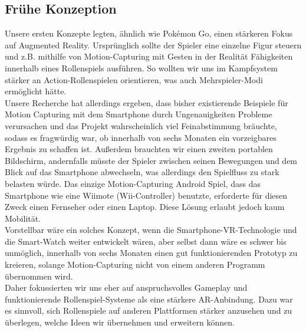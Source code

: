 \documentclass[extern,palatino]{cgBA}
\begin{document}
	\subsection{Frühe Konzeption}
	Unsere ersten Konzepte legten, ähnlich wie Pokémon Go, einen stärkeren Fokus auf Augmented Reality. Ursprünglich sollte der Spieler eine einzelne Figur steuern und z.B. mithilfe von Motion-Capturing mit Gesten in der Realität Fähigkeiten innerhalb eines Rollenspiels ausführen. So wollten wir uns im Kampfsystem stärker an Action-Rollenspielen orientieren, was auch Mehrspieler-Modi ermöglicht hätte.
	\\Unsere Recherche hat allerdings ergeben, dass bisher existierende Beispiele für Motion Capturing mit dem Smartphone durch Ungenauigkeiten Probleme verursachen und das Projekt wahrscheinlich viel Feinabstimmung bräuchte, sodass es fragwürdig war, ob innerhalb von sechs Monaten ein vorzeigbares Ergebnis zu schaffen ist. Außerdem brauchten wir einen zweiten portablen Bildschirm, andernfalls müsste der Spieler zwischen seinen Bewegungen und dem Blick auf das Smartphone abwechseln, was allerdings den Spielfluss zu stark belasten würde. Das einzige Motion-Capturing Android Spiel, dass das Smartphone wie eine Wiimote (Wii-Controller) benutzte, erforderte für diesen Zweck einen Fernseher oder einen Laptop. Diese Lösung erlaubt jedoch kaum Mobilität.
	\\Vorstellbar wäre ein solches Konzept, wenn die Smartphone-VR-Technologie und die Smart-Watch weiter entwickelt wären, aber selbst dann wäre es schwer bis unmöglich, innerhalb von sechs Monaten einen gut funktionierenden Prototyp zu kreieren, solange Motion-Capturing nicht von einem anderen Programm übernommen wird.
\\Daher fokussierten wir uns eher auf anspruchsvolles Gameplay und funktionierende Rollenspiel-Systeme als eine stärkere AR-Anbindung. Dazu war es sinnvoll, sich Rollenspiele auf anderen Plattformen stärker anzusehen und zu überlegen, welche Ideen wir übernehmen und erweitern können.
\newpage
\end{document}
